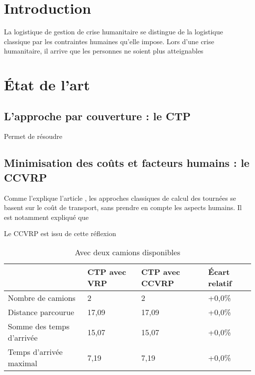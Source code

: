 \documentclass[12pt, a4paper, onecolumn, twoside,french,cleardoublepage=plain,openany]{article}
\begin{document}

\section{Introduction}\label{introduction}
La logistique de gestion de crise humanitaire se distingue de la logistique classique par les contraintes humaines qu'elle impose. 
Lors d'une crise humanitaire, il arrive que les personnes ne soient plus atteignables

\section{État de l'art}
\subsection{L'approche par couverture : le CTP} \label{CTP}
Permet de résoudre 
\subsection{Minimisation des coûts et facteurs humains : le CCVRP} \label{CCVRP}
Comme l'explique l'article \cite{campbell_routing_2008}, les approches classiques de calcul des tournées se basent sur le coût de transport, sans prendre en compte les aspects humains. Il est notamment expliqué que %

Le CCVRP est issu de cette réflexion %


\begin{table}[h] \centering
\begin{tabular}{@{}llll@{}}
\toprule %
 & CTP avec VRP & CTP avec CCVRP & Écart relatif \\ \midrule
Nombre de camions & 2 & 2 & +0,0\% \\
Distance parcourue & 17,09 & 17,09 & +0,0\% \\
Somme des temps d'arrivée & 15,07 & 15,07 & +0,0\% \\
Temps d'arrivée maximal & 7,19 & 7,19 & +0,0\% \\ \bottomrule
\end{tabular}
\caption{Avec deux camions disponibles}
\label{deux_camions}
\end{table}
\end{document}
